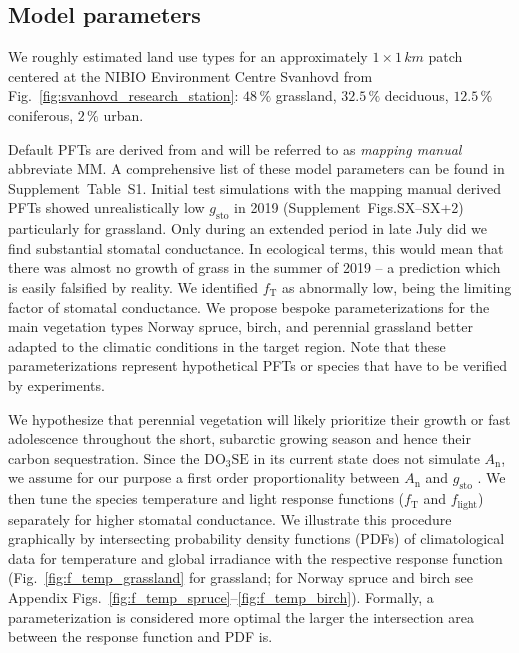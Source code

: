 \documentclass[bg, manuscript]{copernicus}
\begin{document}
\subsection{Model parameters}
We roughly estimated land use types for an approximately $1\times 1\,\unit{km}$ patch centered at the NIBIO Environment Centre Svanhovd from Fig.~\ref{fig:svanhovd_research_station}: $48\,\unit{\%}$ grassland, $32.5\,\unit{\%}$ deciduous, $12.5\,\unit{\%}$ coniferous, $2\,\unit{\%}$ urban.

Default PFTs are derived from \citet{ICP:MappingManual2017} and will be referred to as \emph{mapping manual} abbreviate MM. A comprehensive list of these model parameters can be found in Supplement~Table~S1.
Initial test simulations with the mapping manual derived PFTs showed unrealistically low $g_\mathrm{sto}$ in 2019 (Supplement~Figs.SX--SX+2) particularly for grassland. Only during an extended period in late July did we find substantial stomatal conductance. In ecological terms, this would mean that there was almost no growth of grass in the summer of 2019 -- a prediction which is easily falsified by reality. We identified $f_\mathrm{T}$ as abnormally low, being the limiting factor of stomatal conductance. We propose bespoke parameterizations for the main vegetation types Norway spruce, birch, and perennial grassland better adapted to the climatic conditions in the target region.
Note that these parameterizations represent hypothetical PFTs or species that have to be verified by experiments. 

We hypothesize that perennial vegetation will likely prioritize their growth or fast adolescence throughout the short, subarctic growing season and hence their carbon sequestration. Since the $\mathrm{DO_3SE}$ in its current state does not simulate $A_\mathrm{n}$, we assume for our purpose a first order proportionality between $A_\mathrm{n}$ and $g_\mathrm{sto}$ \citep{GCB:Medlyn2011}. We then tune the species temperature and light response functions ($f_\mathrm{T}$ and $f_\mathrm{light}$) separately for higher stomatal conductance. We illustrate this procedure graphically by intersecting probability density functions (PDFs) of climatological data for temperature and global irradiance with the respective response function (Fig.~\ref{fig:f_temp_grassland} for grassland; for Norway spruce and birch see Appendix Figs.~\ref{fig:f_temp_spruce}--\ref{fig:f_temp_birch}). Formally, a parameterization is considered more optimal the larger the intersection area between the response function and PDF is. 
\end{document}
